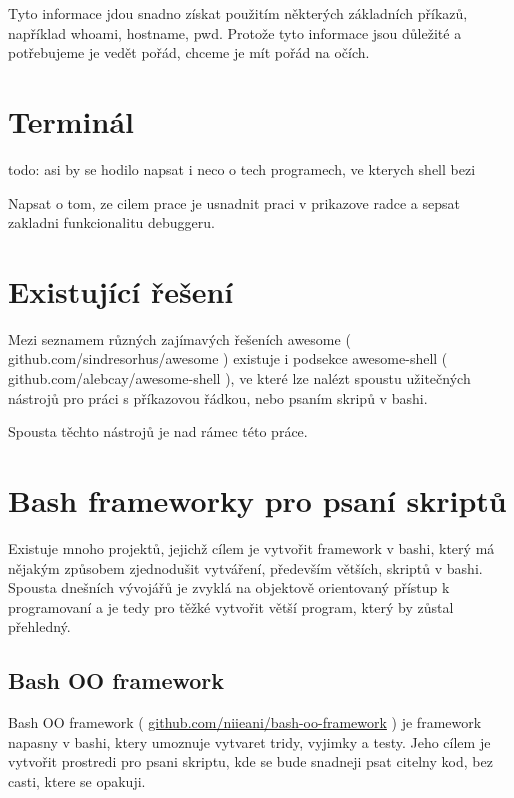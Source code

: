\documentclass[thesis=M,czech]{FITthesis}[2012/06/26]
\begin{document}
Tyto informace jdou snadno získat použitím některých základních příkazů, například whoami, hostname, pwd. Protože tyto informace jsou důležité a potřebujeme je vedět pořád, chceme je mít pořád na očích.

\section{Terminál}
todo: asi by se hodilo napsat i neco o tech programech, ve kterych shell bezi



Napsat o tom, ze cilem prace je usnadnit praci v prikazove radce a sepsat zakladni funkcionalitu debuggeru.





\section{Existující řešení}

Mezi seznamem různých zajímavých řešeních awesome ( github.com/sindresorhus/awesome ) existuje i podsekce awesome-shell ( github.com/alebcay/awesome-shell ), ve které lze nalézt spoustu užitečných nástrojů pro práci s příkazovou řádkou, nebo psaním skripů v bashi.

Spousta těchto nástrojů je nad rámec této práce. 


\section{Bash frameworky pro psaní skriptů}

Existuje mnoho projektů, jejichž cílem je vytvořit framework v bashi, který má nějakým způsobem zjednodušit vytváření, především větších, skriptů v bashi. Spousta dnešních vývojářů je zvyklá na objektově orientovaný přístup k programovaní a je tedy pro těžké vytvořit větší program, který by zůstal přehledný.

\subsection{Bash OO framework}
Bash OO framework ( \url{github.com/niieani/bash-oo-framework} ) je framework napasny v bashi, ktery umoznuje vytvaret tridy, vyjimky a testy. Jeho cílem je vytvořit prostredi pro psani skriptu, kde se bude snadneji psat citelny kod, bez casti, ktere se opakuji.
\end{document}

